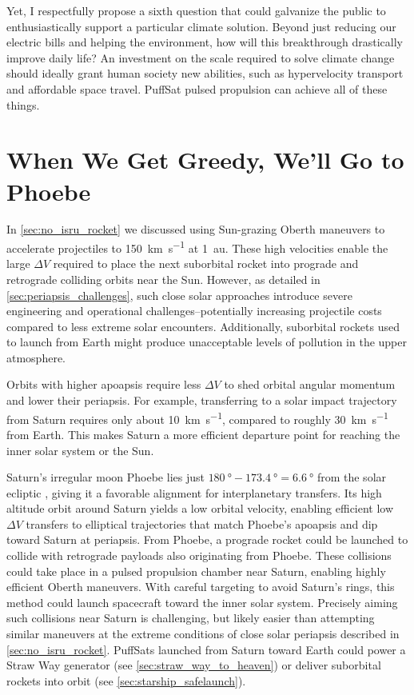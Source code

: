 \documentclass{article}
\begin{document}
Yet, I respectfully propose a sixth question that could galvanize the public to enthusiastically support a particular climate solution. Beyond just reducing our electric bills and helping the environment, how will this breakthrough drastically improve daily life? An investment on the scale required to solve climate change should ideally grant human society new abilities, such as hypervelocity transport and affordable space travel. PuffSat pulsed propulsion can achieve all of these things.  

\section{When We Get Greedy, We'll Go to Phoebe}\label{sec:greedy_phoebe}
In \autoref{sec:no_isru_rocket} we discussed using Sun-grazing Oberth maneuvers to accelerate projectiles to \SI{150}{\kilo\meter\per\second} at \SI{1}{\astronomicalunit}. These high velocities enable the large $\Delta V$ required to place the next suborbital rocket into prograde and retrograde colliding orbits near the Sun.  However, as detailed in \autoref{sec:periapsis_challenges}, such close solar approaches introduce severe engineering and operational challenges--potentially increasing projectile costs compared to less extreme solar encounters.  Additionally, suborbital rockets used to launch from Earth might produce unacceptable levels of pollution in the upper atmosphere.

Orbits with higher apoapsis require less $\Delta V$ to shed orbital angular momentum and lower their periapsis. For example, transferring to a solar impact trajectory from Saturn requires only about \SI{10}{\kilo\meter\per\second}, compared to roughly \SI{30}{\kilo\meter\per\second} from Earth. This makes Saturn a more efficient departure point for reaching the inner solar system or the Sun.

Saturn’s irregular moon Phoebe lies just $\SI{180}{\degree} - \SI{173.4}{\degree} = \SI{6.6}{\degree}$ from the solar ecliptic \cite{phoebe}, giving it a favorable alignment for interplanetary transfers. Its high altitude orbit around Saturn yields a low orbital velocity, enabling efficient low $\Delta V$ transfers to elliptical trajectories that match Phoebe’s apoapsis and dip toward Saturn at periapsis.  From Phoebe, a prograde rocket could be launched to collide with retrograde payloads also originating from Phoebe. These collisions could take place in a pulsed propulsion chamber near Saturn, enabling highly efficient Oberth maneuvers. With careful targeting to avoid Saturn’s rings, this method could launch spacecraft toward the inner solar system. Precisely aiming such collisions near Saturn is challenging, but likely easier than attempting similar maneuvers at the extreme conditions of close solar periapsis described in \autoref{sec:no_isru_rocket}. PuffSats launched from Saturn toward Earth could power a Straw Way generator (see \autoref{sec:straw_way_to_heaven}) or deliver suborbital rockets into orbit (see \autoref{sec:starship_safelaunch}).
\end{document}
